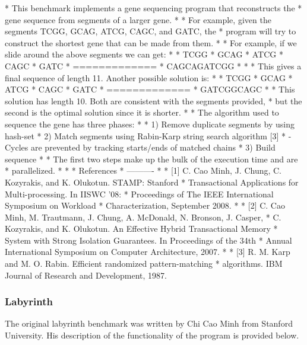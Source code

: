 \documentclass{article}
\begin{document}
* This benchmark implements a gene sequencing program that reconstructs the 
* gene sequence from segments of a larger gene.
* 
* For example, given the segments TCGG, GCAG, ATCG, CAGC, and GATC, the 
* program will try to construct the shortest gene that can be made from them.
*
* For example, if we slide around the above segments we can get:
*
*             TCGG
*        GCAG
*            ATCG
*      CAGC
*           GATC
*     =============
*      CAGCAGATCGG
*
*
* This gives a final sequence of length 11. Another possible solution is:
*
*        TCGG
*           GCAG
*       ATCG
*            CAGC
*      GATC
*     =============
*      GATCGGCAGC
*
* This solution has length 10. Both are consistent with the segments provided,
* but the second is the optimal solution since it is shorter.
*
* The algorithm used to sequence the gene has three phases:
*
*    1) Remove duplicate segments by using hash-set
*    2) Match segments using Rabin-Karp string search algorithm [3]
*       - Cycles are prevented by tracking starts/ends of matched chains
*    3) Build sequence
*
* The first two steps make up the bulk of the execution time and are 
* parallelized.
*
*
* References
* ----------
*
* [1] C. Cao Minh, J. Chung, C. Kozyrakis, and K. Olukotun. STAMP: Stanford 
*     Transactional Applications for Multi-processing. In IISWC '08: 
*     Proceedings of The IEEE International Symposium on Workload 
*     Characterization, September 2008. 
*
* [2] C. Cao Minh, M. Trautmann, J. Chung, A. McDonald, N. Bronson, J. Casper,
*     C. Kozyrakis, and K. Olukotun. An Effective Hybrid Transactional Memory
*     System with Strong Isolation Guarantees. In Proceedings of the 34th 
*     Annual International Symposium on Computer Architecture, 2007.
*
* [3] R. M. Karp and M. O. Rabin. Efficient randomized pattern-matching
*     algorithms. IBM Journal of Research and Development, 1987.

\subsubsection{Labyrinth}

The original labyrinth benchmark was written by Chi Cao Minh from Stanford 
University. His description of the functionality of the program is provided 
below.
\end{document}
